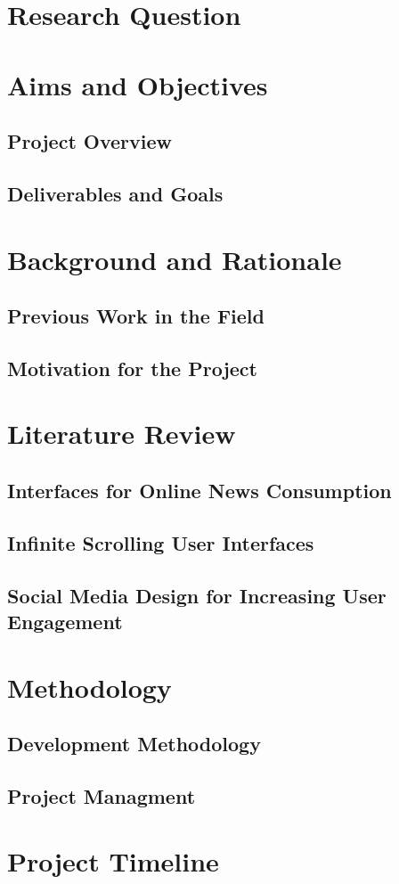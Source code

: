 \documentclass[12pt,titlepage]{article}
\begin{document}
\tableofcontents
\newpage

\section{Research Question}



\section{Aims and Objectives}

  \subsection{Project Overview}

  \subsection{Deliverables and Goals}

\section{Background and Rationale}

  \subsection{Previous Work in the Field}

  \subsection{Motivation for the Project}

\section{Literature Review}

  \subsection{Interfaces for Online News Consumption}

  \subsection{Infinite Scrolling User Interfaces}

  \subsection{Social Media Design for Increasing User Engagement}

\section{Methodology}

  \subsection{Development Methodology}

  \subsection{Project Managment}

\section{Project Timeline}
\end{document}
